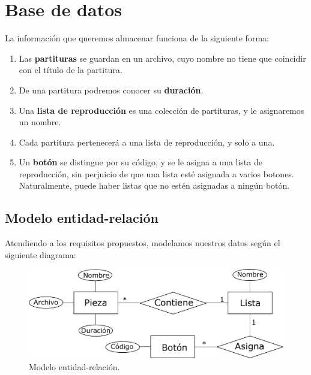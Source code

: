 \newpage

\section{Base de datos}
\label{sec:database}

La información que queremos almacenar funciona de la siguiente forma:

\begin{enumerate}
	\item Las \textbf{partituras} se guardan en un archivo, cuyo nombre no tiene que coincidir con el título de la partitura.
	\item De una partitura podremos conocer su \textbf{duración}.
	\item Una \textbf{lista de reproducción} es una colección de partituras, y le asignaremos un nombre.
	\item Cada partitura pertenecerá a una lista de reproducción, y solo a una.
	\item Un \textbf{botón} se distingue por su código, y se le asigna a una lista de reproducción, sin perjuicio de que una lista esté asignada a varios botones. Naturalmente, puede haber listas que no estén asignadas a ningún botón.
\end{enumerate}

\subsection{Modelo entidad-relación}

Atendiendo a los requisitos propuestos, modelamos nuestros datos según el siguiente diagrama:

\smallskip

\begin{figure}[H]
	\noindent \begin{centering}
		\includegraphics[width=\linewidth*3/4]{capitulo4/bd_er}
		\par\end{centering}
	\smallskip
	\caption{\label{fig:bd_er} Modelo entidad-relación.}
\end{figure} 


